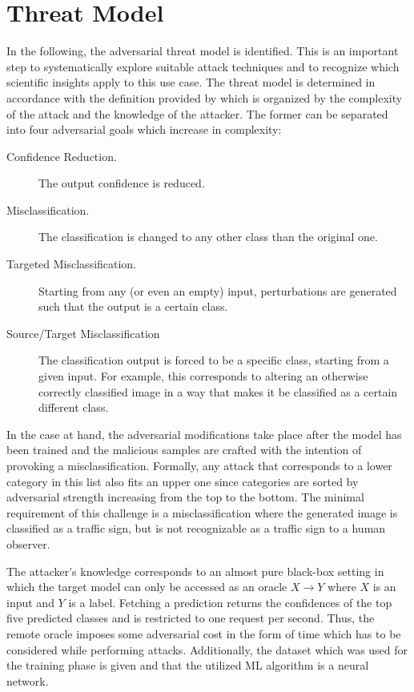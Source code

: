 
\section{Threat Model}
\label{sec:threatmodel}
In the following, the adversarial threat model is identified.
This is an important step to systematically explore suitable attack techniques and to recognize which scientific insights apply to this use case.
The threat model is determined in accordance with the definition provided by \citet{papernot2016limitations} which is organized by the complexity of the attack and the knowledge of the attacker.
The former can be separated into four adversarial goals which increase in complexity:
\begin{description}
	\item [Confidence Reduction.] The output confidence is reduced.
	\item [Misclassification.] The classification is changed to any other class than the original one.
	\item [Targeted Misclassification.] Starting from any (or even an empty) input, perturbations are generated such that the output is a certain class.
	\item [Source/Target Misclassification] The classification output is forced to be a specific class, starting from a given input. For example, this corresponds to altering an otherwise correctly classified image in a way that makes it be classified as a certain different class.
\end{description}
In the case at hand, the adversarial modifications take place after the model has been trained and the malicious samples are crafted with the intention of provoking a misclassification.
Formally, any attack that corresponds to a lower category in this list also fits an upper one since categories are sorted by adversarial strength increasing from the top to the bottom.
The minimal requirement of this challenge is a misclassification where the generated image is classified as a traffic sign, but is not recognizable as a traffic sign to a human observer.

The attacker's knowledge corresponds to an almost pure black-box setting in which the target model can only be accessed as an oracle $X \rightarrow Y$ where $X$ is an input and $Y$ is a label.
Fetching a prediction returns the confidences of the top five predicted classes and is restricted to one request per second.
Thus, the remote oracle imposes some adversarial cost in the form of time which has to be considered while performing attacks.
Additionally, the dataset which was used for the training phase is given and that the utilized ML algorithm is a neural network.